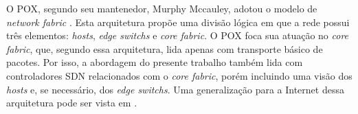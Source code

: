 O POX, segundo seu mantenedor, Murphy Mccauley, 
adotou o modelo de \emph{network fabric} \citep{martin2012fabric}. 
Esta arquitetura propõe uma divisão lógica em que a rede possui três elementos: 
\emph{hosts}, \emph{edge switchs} e \emph{core fabric}. 
O POX foca sua atuação no \emph{core fabric}, que, 
segundo essa arquitetura, lida apenas com transporte básico de pacotes.
Por isso, a abordagem do presente trabalho também lida com
controladores SDN relacionados com o \emph{core fabric}, 
porém incluindo uma visão dos \emph{hosts} e, se necessário, dos \emph{edge switchs}.
Uma generalização para a Internet dessa arquitetura pode ser 
vista em \citep{barath2012software}. 
